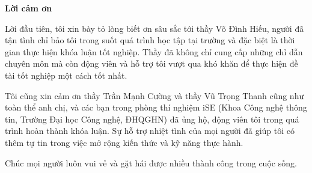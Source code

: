\begin{center}
\textbf{\large{Lời cảm ơn}	}
\end{center}

Lời đầu tiên, tôi xin bày tỏ lòng biết ơn sâu sắc tới thầy Võ Đình Hiếu, người đã tận tình chỉ bảo tôi trong suốt quá trình học tập tại trường và đặc biệt là thời gian thực hiện khóa luận tốt nghiệp.
Thầy đã không chỉ cung cấp những chỉ dẫn chuyên môn mà còn động viên và hỗ trợ tôi vượt qua khó khăn để thực hiện đề tài tốt nghiệp một cách tốt nhất.

Tôi cũng xin cảm ơn thầy Trần Mạnh Cường và thầy Vũ Trọng Thanh cũng như toàn thể anh chị, và các bạn trong phòng thí nghiệm iSE (Khoa Công nghệ thông tin, Trường Đại học Công nghệ, ĐHQGHN) đã ủng hộ, động viên tôi trong quá trình hoàn thành khóa luận.
Sự hỗ trợ nhiệt tình của mọi người đã giúp tôi có thêm tự tin trong việc mở rộng kiến thức và kỹ năng thực hành.

Chúc mọi người luôn vui vẻ và gặt hái được nhiều thành công trong cuộc sống.

